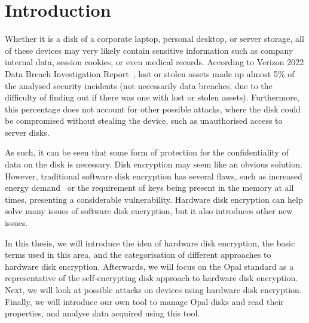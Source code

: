 
\chapter{Introduction}





Whether it is a disk of a corporate laptop, personal desktop, or server storage, all of these devices may very likely contain sensitive information such as company internal data, session cookies, or even medical records.
According to Verizon 2022 Data Breach Investigation Report~\cite{verizon_dbir}, lost or stolen assets made up almost 5\% of the analysed security incidents (not necessarily data breaches, due to the difficulty of finding out if there was one with lost or stolen assets). Furthermore, this percentage does not account for other possible attacks, where the disk could be compromised without stealing the device, such as unauthorised access to server disks.

As such, it can be seen that some form of protection for the confidentiality of data on the disk is necessary. Disk encryption may seem like an obvious solution. However, traditional software disk encryption has several flaws, such as increased energy demand~\cite{comparing_the_power} or the requirement of keys being present in the memory at all times, presenting a considerable vulnerability.
Hardware disk encryption can help solve many issues of software disk encryption, but it also introduces other new issues.

In this thesis, we will introduce the idea of hardware disk encryption, the basic terms used in this area, and the categorisation of different approaches to hardware disk encryption. Afterwards, we will focus on the Opal standard as a representative of the self-encrypting disk approach to hardware disk encryption. Next, we will look at possible attacks on devices using hardware disk encryption. Finally, we will introduce our own tool to manage Opal disks and read their properties, and analyse data acquired using this tool.



